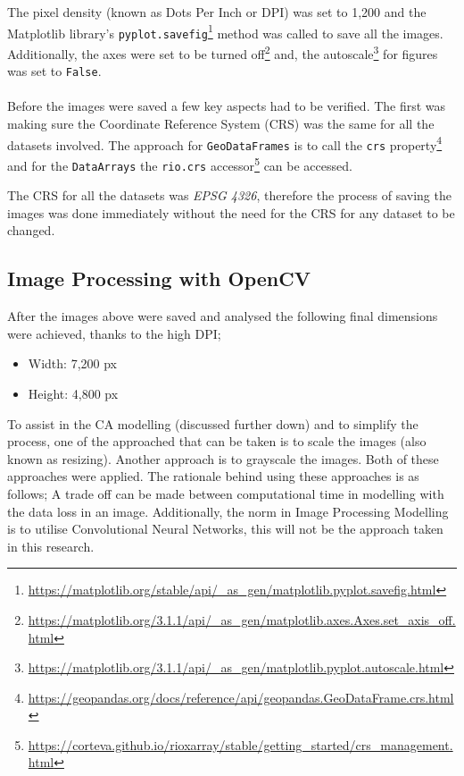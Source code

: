 The pixel density (known as Dots Per Inch or DPI)\cite{dpi} was set to 1,200 and the Matplotlib library's \texttt{pyplot.savefig}\footnote{\url{https://matplotlib.org/stable/api/_as_gen/matplotlib.pyplot.savefig.html}} method was called to save all the images. Additionally, the axes were set to be turned off\footnote{\url{https://matplotlib.org/3.1.1/api/_as_gen/matplotlib.axes.Axes.set_axis_off.html}} and, the autoscale\footnote{\url{https://matplotlib.org/3.1.1/api/_as_gen/matplotlib.pyplot.autoscale.html}} for figures was set to \texttt{False}.\\\\
Before the images were saved a few key aspects had to be verified. The first was making sure the Coordinate Reference System (CRS) was the same for all the datasets involved. The approach for \texttt{GeoDataFrames} is to call the \texttt{crs} property\footnote{\url{https://geopandas.org/docs/reference/api/geopandas.GeoDataFrame.crs.html}} and for the \texttt{DataArrays} the \texttt{rio.crs} accessor\footnote{\url{https://corteva.github.io/rioxarray/stable/getting_started/crs_management.html}} can be accessed.

The CRS for all the datasets was \textit{EPSG 4326}, therefore the process of saving the images was done immediately without the need for the CRS for any dataset to be changed.
\subsection{Image Processing with OpenCV}
\label{sec:imgproc}
After the images above were saved and analysed the following final dimensions were achieved, thanks to the high DPI;
\begin{itemize}
\item Width: 7,200 px
\item Height: 4,800 px
\end{itemize}
To assist in the CA modelling (discussed further down) and to simplify the process, one of the approached that can be taken is to scale the images (also known as resizing). Another approach is to grayscale the images. Both of these approaches were applied. The rationale behind using these approaches is as follows; A trade off can be made between computational time in modelling with the data loss in an image.\cite{impact} Additionally, the norm in Image Processing Modelling is to utilise Convolutional Neural Networks, this will not be the approach taken in this research.\cite{cnn}


